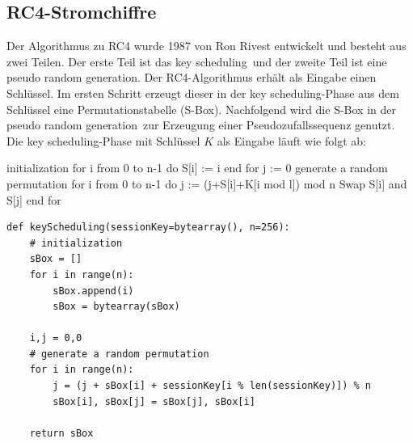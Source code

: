 \documentclass[10pt,a4paper]{article}
\begin{document}
\subsection{RC4-Stromchiffre}
Der Algorithmus zu RC4 wurde 1987 von Ron Rivest entwickelt und besteht aus zwei Teilen. Der erste Teil ist das \glqq key scheduling\grqq\ und der zweite Teil ist eine \glqq pseudo random generation\grqq . Der RC4-Algorithmus erhält als Eingabe einen Schlüssel. Im ersten Schritt erzeugt dieser in der \glqq key scheduling\grqq -Phase aus dem Schlüssel eine Permutationstabelle (S-Box). Nachfolgend wird die S-Box in der \glqq pseudo random generation\grqq\ zur Erzeugung einer Pseudozufallssequenz genutzt.\\
Die \glqq key scheduling\grqq -Phase mit Schlüssel $K$ als Eingabe läuft wie folgt ab:
\begin{center}
\hspace{5pt}
\begin{minipage}[t]{.35\textwidth}
\begin{algorithm}
{initialization}
for i from 0 to n-1 do
    S[i] := i
end for
j := 0
{generate a random permutation}
for i from 0 to n-1 do
    j := (j+S[i]+K[i mod l]) mod n
    Swap S[i] and S[j]
end for
\end{algorithm}
\end{minipage}\hspace{0.4cm}
\begin{minipage}[t]{.60\textwidth}
  \begin{lstlisting}
def keyScheduling(sessionKey=bytearray(), n=256):
	# initialization
	sBox = []
	for i in range(n):
   		sBox.append(i)
   		sBox = bytearray(sBox)

   	i,j = 0,0
   	# generate a random permutation
   	for i in range(n):
     	j = (j + sBox[i] + sessionKey[i % len(sessionKey)]) % n
    	sBox[i], sBox[j] = sBox[j], sBox[i]

	return sBox
\end{lstlisting}
\end{minipage}
\end{center}
\end{document}
